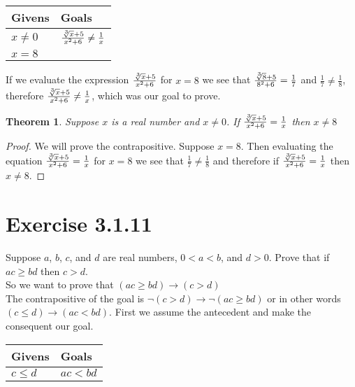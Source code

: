 \documentclass{article}
\newcommand{\n}{ \noindent }
\newtheorem*{theorem}{Theorem}  %
\begin{document}
\begin{table}[h]
\begin{tabular}{ll}
\hline
Givens & Goals  \\ \hline
$x \neq 0$ & $\tfrac{\sqrt[\leftroot{-1}\uproot{1}3]{x} + 5}{x^2 + 6} \neq \tfrac{1}{x}$ \\
$x = 8$ & \\ \hline
\end{tabular}
\end{table}

\n If we evaluate the expression $\tfrac{\sqrt[\leftroot{-1}\uproot{1}3]{x} + 5}{x^2 + 6}$ for $x = 8$ we see that $\tfrac{\sqrt[\leftroot{-1}\uproot{1}3]{8} + 5}{8^2 + 6} = \tfrac{1}{7}$ and $\tfrac{1}{7} \neq \tfrac{1}{8}$, therefore $\tfrac{\sqrt[\leftroot{-1}\uproot{1}3]{x} + 5}{x^2 + 6} \neq \tfrac{1}{x}$, which was our goal to prove.

\begin{theorem} Suppose $x$ is a real number and $x \neq 0$. If $\tfrac{\sqrt[\leftroot{-1}\uproot{1}3]{x} + 5}{x^2 + 6} = \tfrac{1}{x}$ then $x \neq 8$
\end{theorem}
\begin{proof}
We will prove the contrapositive. Suppose $x = 8$. Then evaluating the equation $\tfrac{\sqrt[\leftroot{-1}\uproot{1}3]{x} + 5}{x^2 + 6} = \tfrac{1}{x}$ for $x = 8$ we see that $\tfrac{1}{7} \neq \tfrac{1}{8}$ and therefore if $\tfrac{\sqrt[\leftroot{-1}\uproot{1}3]{x} + 5}{x^2 + 6} = \tfrac{1}{x}$ then $x \neq 8$.
\end{proof}


\section*{Exercise 3.1.11}
Suppose $a$, $b$, $c$, and $d$ are real numbers, $0<a<b$, and $d>0$. Prove that if $ac \geq bd$ then $c>d$. \\

\n So we want to prove that
$(ac \geq bd) \rightarrow (c>d)$ \\

\n The contrapositive of the goal is $\neg(c>d) \rightarrow \neg(ac \geq bd)$ or in other words $(c \leq d) \rightarrow (ac < bd)$. First we assume the antecedent and make the consequent our goal.

\begin{table}[h]
\begin{tabular}{ll}
\hline
Givens & Goals   \\ \hline
$c \leq d$ & $ac < bd$   \\ \hline
\end{tabular}
\end{table}
\end{document}
